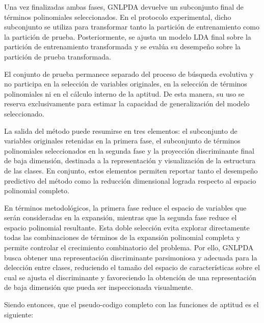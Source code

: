 Una vez finalizadas ambas fases, GNLPDA devuelve un subconjunto final de términos
polinomiales seleccionados. En el protocolo experimental, dicho subconjunto se utiliza para transformar tanto la partición de entrenamiento como la partición de prueba. Posteriormente, se ajusta un modelo LDA final sobre la partición de entrenamiento transformada y se evalúa su desempeño sobre la partición de prueba transformada.

El conjunto de prueba permanece separado del proceso de búsqueda evolutiva y no participa en la selección de variables originales, en la selección de términos polinomiales ni en el cálculo interno de la aptitud. De esta manera, su uso se reserva exclusivamente para estimar la capacidad de generalización del modelo seleccionado.

La salida del método puede resumirse en tres elementos: el subconjunto de variables
originales retenidas en la primera fase, el subconjunto de términos polinomiales
seleccionados en la segunda fase y la proyección discriminante final de baja dimensión, destinada a la representación y visualización de la estructura de las clases.
En conjunto, estos elementos permiten reportar tanto el desempeño predictivo del método como la reducción dimensional lograda respecto al espacio polinomial completo.

En términos metodológicos, la primera fase reduce el espacio de variables que serán consideradas en la expansión, mientras que la segunda fase reduce el espacio polinomial resultante. Esta doble selección evita explorar directamente todas las combinaciones de términos de la expansión polinomial completa y permite controlar el crecimiento combinatorio del problema. Por ello, GNLPDA busca obtener una representación discriminante parsimoniosa y adecuada para la delección entre clases, reduciendo el tamaño del espacio de características sobre el cual se ajusta el discriminante y favoreciendo la obtención de una representación de baja dimensión que pueda ser inspeccionada visualmente.

Siendo entonces, que el pseudo-codigo completo con las funciones de aptitud es el siguiente:

